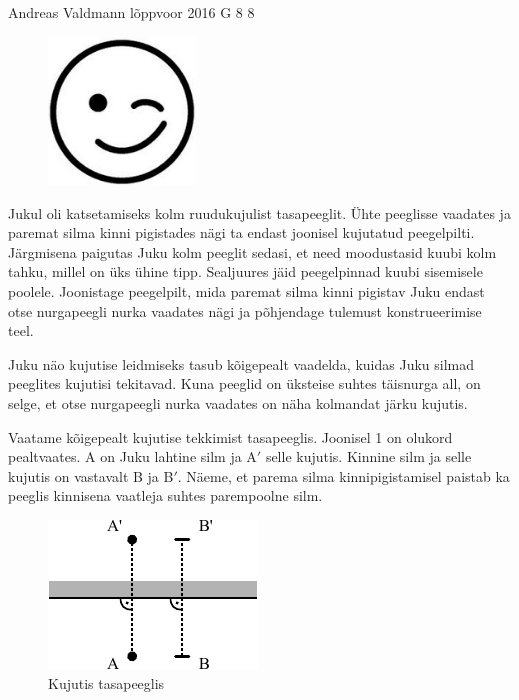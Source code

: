 {Andreas Valdmann} %
{lõppvoor} %
{2016} %
{G 8} %
{8} %
{
\ifStatement
\begin{figure}
	\vspace{-25pt}
	\begin{center}
		\includegraphics[width=0.35\textwidth]{2016-v3g-08-wink.png}
	\end{center}
	\vspace{-20pt}
\end{figure}

Jukul oli katsetamiseks kolm ruudukujulist tasapeeglit. Ühte peeglisse vaadates ja paremat silma kinni pigistades nägi ta endast joonisel kujutatud peegelpilti. Järgmisena paigutas Juku kolm peeglit sedasi, et need moodustasid kuubi kolm tahku, millel on üks ühine tipp. Sealjuures jäid peegelpinnad kuubi sisemisele poolele. Joonistage peegelpilt, mida paremat silma kinni pigistav Juku endast otse nurgapeegli nurka vaadates nägi ja põhjendage tulemust konstrueerimise teel.
\fi


\ifHint
Juku näo kujutise leidmiseks tasub kõigepealt vaadelda, kuidas Juku silmad peeglites kujutisi tekitavad. Kuna peeglid on üksteise suhtes täisnurga all, on selge, et otse nurgapeegli nurka vaadates on näha kolmandat järku kujutis.
\fi


\ifSolution
Vaatame kõigepealt kujutise tekkimist tasapeeglis. Joonisel 1 on olukord pealtvaates. A on Juku lahtine silm ja A$'$ selle kujutis. Kinnine silm ja selle kujutis on vastavalt B ja B$'$. Näeme, et parema silma kinnipigistamisel paistab ka peeglis kinnisena vaatleja suhtes parempoolne silm.
\begin{figure}[h]
	\centerline{\includegraphics[scale=1.2]{2016-v3g-08-nurgapeegel_j1}}
	\caption{Kujutis tasapeeglis}
\end{figure}

}
